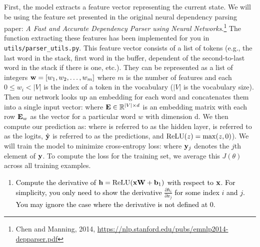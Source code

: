 \begin{parts}
    First, the model extracts a feature vector representing the current state. We will be using the feature set presented in the original neural dependency parsing paper: {\it A Fast and Accurate Dependency Parser using Neural Networks}.\footnote{Chen and Manning, 2014, \url{https://nlp.stanford.edu/pubs/emnlp2014-depparser.pdf}} The function extracting these features has been implemented for you in \texttt{utils/parser\_utils.py}. This feature vector consists of a list of tokens (e.g., the last word in the stack, first word in the buffer, dependent of the second-to-last word in the stack if there is one, etc.). They can be represented as a list of integers $\mathbf{w} = [w_1, w_2, \dots, w_m]$ where $m$ is the number of features and each $0 \leq w_i < |V|$ is the index of a token in the vocabulary ($|V|$ is the vocabulary size). Then our network looks up an embedding for each word and concatenates them into a single input vector:
    where $\mathbf{E} \in \mathbb{R}^{|V| \times d}$ is an embedding matrix with each row $\mathbf{E}_w$ as the vector for a particular word $w$ with dimension d. We then compute our prediction as:
    where \bh \space is referred to as the hidden layer, \bl \space is referred to as the logits, $\hat{\mathbf{y}}$ \space is referred to as the predictions, and $\operatorname{ReLU}(z) = \max(z, 0)$). We will train the model to minimize cross-entropy loss:
     where $\mathbf{y}_j$ denotes the $j$th element of $\mathbf{y}$.
    To compute the loss for the training set, we average this $J(\theta)$ across all training examples.
    
    \begin{enumerate}[label=\roman*.]
    
        \item \textcolor{black}{Compute the derivative of $\mathbf{h} = \operatorname{ReLU}(\mathbf{x} \mathbf{W} + \mathbf{b}_1)$ with respect to $\mathbf{x}$. For simplicity, you only need to show the derivative $\frac{\partial h_i}{\partial x_j}$ for some index $i$ and $j$. You may ignore the case where the derivative is not defined at 0.}


\end{enumerate}
\end{parts}
